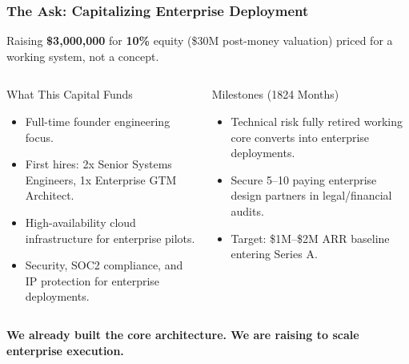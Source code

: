 \documentclass[aspectratio=169,11pt]{beamer}
\begin{document}
	\begin{frame}
		\frametitle{The Ask: Capitalizing Enterprise Deployment}
		Raising \textbf{\$3,000,000} for \textbf{10\%} equity (\$30M post-money valuation) \textemdash{} priced for a working system, not a concept.

		\begin{columns}[T]
			\begin{block}{What This Capital Funds}
				\begin{itemize}
					\item Full-time founder engineering focus.
					\item First hires: 2x Senior Systems Engineers, 1x Enterprise GTM Architect.
					\item High-availability cloud infrastructure for enterprise pilots.
					\item Security, SOC2 compliance, and IP protection for enterprise deployments.
				\end{itemize}
			\end{block}

			\begin{block}{Milestones (18\textendash{}24 Months)}
				\begin{itemize}
					\item Technical risk fully retired \textemdash{} working core converts into enterprise deployments.
					\item Secure 5–10 paying enterprise design partners in legal/financial audits.
					\item Target: \$1M–\$2M ARR baseline entering Series A.
				\end{itemize}
			\end{block}
		\end{columns}
		\vfill
		\centering
		{\color{CitadelHighlight}\bfseries We already built the core architecture. We are raising to scale enterprise execution.}
	\end{frame}
\end{document}
